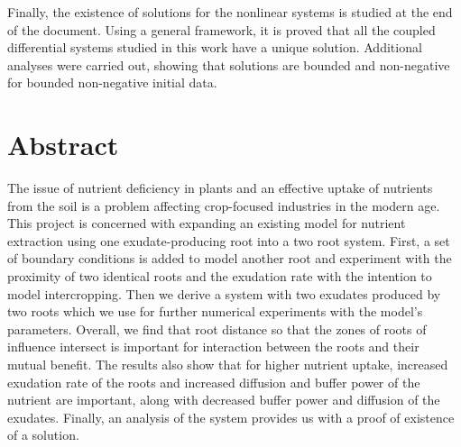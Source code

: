 \documentclass[11pt]{article}
\numberwithin{equation}{section}
\begin{document}

Finally, the existence of solutions for the nonlinear systems is studied at the end of the document. Using a general framework, it is proved that all the coupled differential systems studied in this work have a unique solution. Additional analyses were carried out, showing that solutions are bounded and non-negative for bounded non-negative initial data. 




\newpage
\section*{Abstract}
The issue of nutrient deficiency in plants and an effective uptake of nutrients from the soil is a problem affecting crop-focused industries in the modern age. This project is concerned with expanding an existing model for nutrient extraction using one exudate-producing root into a two root system. First, a set of boundary conditions is added to model another root 
and experiment with the proximity of two identical roots and the exudation rate with the intention to model intercropping.
Then we derive a system with two exudates produced by two roots which we use for further numerical experiments with the model's parameters. Overall, we find that root distance so that the zones of roots of influence intersect is important for interaction between the roots and their mutual benefit. The results also show that for higher nutrient uptake, increased exudation rate of the roots and increased diffusion and buffer power of the nutrient are important, along with decreased buffer power and diffusion of the exudates.
Finally, an analysis of the system provides us with a proof of existence of a solution.
\end{document}
